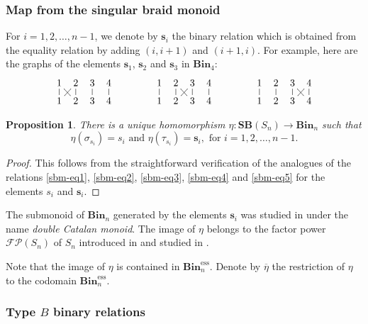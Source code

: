\documentclass[a4paper]{amsart}
\newtheorem{proposition}[theorem]{Proposition}
\begin{document}
\subsubsection{Map from the singular braid monoid}\label{s4.7.2}

For $i=1,2,\dots,n-1$, we denote by $\mathbf{s}_i$ the binary relation which is obtained 
from the equality relation by adding $(i,i+1)$ and $(i+1,i)$.
For example,  here are the graphs of the elements $\mathbf{s}_1$, $\mathbf{s}_2$
and $\mathbf{s}_3$ in $\mathbf{Bin}_4$:
\begin{displaymath}
\xymatrix@C=2mm@R=2mm{
1\ar@{-}[d]\ar@{-}[dr]&2\ar@{-}[d]\ar@{-}[dl]&3\ar@{-}[d]&4\ar@{-}[d]\\
1&2&3&4}\qquad\qquad
\xymatrix@C=2mm@R=2mm{
1\ar@{-}[d]&2\ar@{-}[d]\ar@{-}[dr]&3\ar@{-}[d]\ar@{-}[dl]&4\ar@{-}[d]\\
1&2&3&4}\qquad\qquad
\xymatrix@C=2mm@R=2mm{
1\ar@{-}[d]&2\ar@{-}[d]&3\ar@{-}[d]\ar@{-}[dr]&4\ar@{-}[d]\ar@{-}[dl]\\
1&2&3&4}
\end{displaymath}

\begin{proposition}\label{prop-4.7.2-1}
There is a unique homomorphism $\eta:\mathbf{SB}(S_n)\to\mathbf{Bin}_n$ such that
\begin{displaymath}
\eta(\sigma_{s_i})=s_i\text{ and }
\eta(\tau_{s_i})=\mathbf{s}_i,\text{ for }i=1,2,\dots,n-1.
\end{displaymath}
\end{proposition}

\begin{proof}
This follows from the straightforward verification of the analogues  of the relations 
\eqref{sbm-eq1}, \eqref{sbm-eq2}, \eqref{sbm-eq3}, \eqref{sbm-eq4} and \eqref{sbm-eq5} for the 
elements $s_i$  and $\mathbf{s}_i$.  
\end{proof}

The submonoid of $\mathbf{Bin}_n$ generated by the elements $\mathbf{s}_i$ was studied in
\cite{MaSt} under the name {\em double Catalan monoid}. The image of $\eta$ belongs to
the factor power $\mathcal{FP}(S_n)$ of $S_n$ introduced in \cite{GM2}
and studied in \cite{GM3,GM4,GM5,Ma00,Ma09,Hu10}.

Note that the image of $\eta$ is contained in $\mathbf{Bin}_n^\mathrm{ess}$.
Denote by $\overline{\eta}$ the restriction of $\eta$ to the codomain 
$\mathbf{Bin}_n^\mathrm{ess}$.

\subsubsection{Type $B$ binary relations}\label{s4.7.3}
\end{document}
